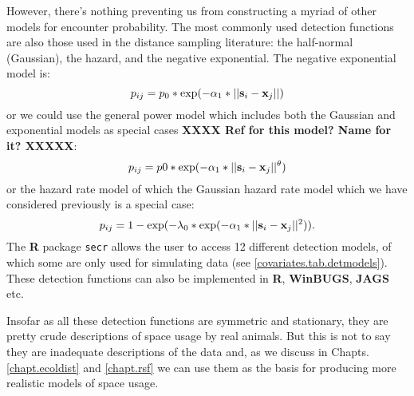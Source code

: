 However, there's nothing preventing us from constructing a myriad of
other models for encounter probability.
The most
commonly used detection functions are also those used in the distance
sampling literature: the half-normal (Gaussian), the hazard, and the negative
exponential.  The negative exponential model is: 
\[
p_{ij} = p_{0}*\exp(-\alpha_{1} *||{\bf s}_{i}-{\bf x}_{j}||)
\]
or we could use the general power model \citep{russell_etal:2012} which includes both the
Gaussian and exponential models as special cases {\bf XXXX Ref for
  this model? Name for it? XXXXX}:
\[
p_{ij} = p0*\exp(-\alpha_{1} *||{\bf s}_{i}-{\bf x}_{j}||^{\theta} )
\]
or the hazard rate model \citep{hayes_buckland:1983} of which the
Gaussian hazard rate model which we have considered previously is a
special case: 
\[
p_{ij} = 1-\exp(-\lambda_{0}* \exp(-\alpha_{1} *||{\bf s}_{i}-{\bf
  x}_{j}||^{2}) ).
\]
The {\bf R} package
{\tt secr} allows the user to access 12 different detection models, of which
some are only used for simulating data (see \ref{covariates.tab.detmodels}). These detection
functions can  also be implemented in {\bf R}, {\bf WinBUGS},
{\bf JAGS} etc.

Insofar as all these detection functions are symmetric and stationary, they are pretty
crude descriptions of space usage by real animals. But this is not to
say they are inadequate descriptions of the data and, as we discuss in
Chapts. \ref{chapt.ecoldist} and \ref{chapt.rsf} we can use them as the
basis for producing more realistic models of space usage.  


